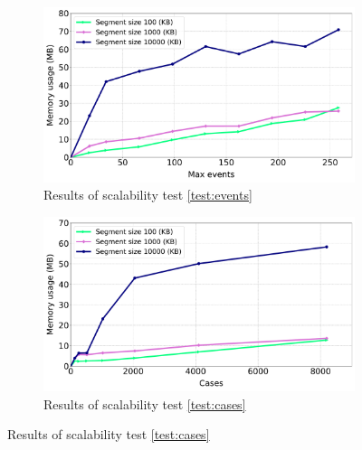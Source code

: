 \begin{figure}[t]
	\begin{subfigure}{0.49\textwidth}   
		\centering
		\includegraphics[width=\textwidth]{content/figures/maxevents-2.pdf}
		\caption{Results of scalability test \ref{test:events}}
		\label{fig:event_results}
	\end{subfigure}
	\begin{subfigure}{0.49\textwidth}   
		\centering
		\includegraphics[width=\textwidth]{content/figures/numtraces-2.pdf}
		\caption{Results of scalability test \ref{test:cases}}
		\label{fig:cases_results}
	\end{subfigure}
	

\end{figure}

